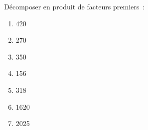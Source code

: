 \documentclass[exercice]{thedocument}%
\begin{document}
%
Décomposer en produit de facteurs premiers~:
\begin{enumerate}
    \item 420
    \item 270
    \item 350
    \item 156
    \item 318
    \item 1620
    \item 2025
\end{enumerate}
\end{document}

